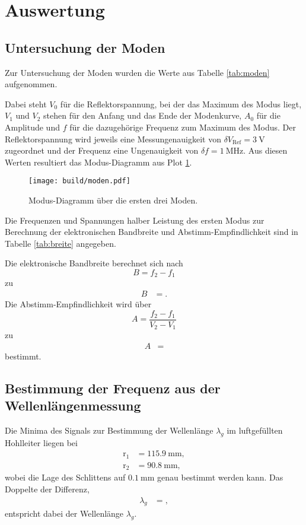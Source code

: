 \section{Auswertung}
\label{sec:Auswertung}


\subsection{Untersuchung der Moden}

Zur Untersuchung der Moden wurden die Werte aus Tabelle \ref{tab:moden} aufgenommen.

Dabei steht $V_0$ für die Reflektorspannung, bei der das Maximum des Modus liegt, $V_1$ und $V_2$ stehen für den Anfang und das Ende der Modenkurve, $A_0$ für die Amplitude und $f$ für die dazugehörige Frequenz zum Maximum des Modus.
Der Reflektorspannung wird jeweils eine Messungenauigkeit von $\delta V_\text{Ref} = \SI{3}{\volt}$ zugeordnet und der Frequenz eine Ungenauigkeit von $\delta f = \SI{1}{\mega\hertz}$.
Aus diesen Werten resultiert das Modus-Diagramm aus Plot \ref{plot:modus}.
\begin{figure}
  \centering
  \texttt{[image: build/moden.pdf]}
  \caption{Modus-Diagramm über die ersten drei Moden.}
  \label{plot:modus}
\end{figure}

Die Frequenzen und Spannungen halber Leistung des ersten Modus zur Berechnung der elektronischen Bandbreite und Abstimm-Empfindlichkeit sind in Tabelle \ref{tab:breite} angegeben.

Die elektronische Bandbreite berechnet sich nach
\begin{equation}
  B = f_2-f_1
\end{equation}
zu
\begin{align*}
  B &= .
\end{align*}
Die Abstimm-Empfindlichkeit wird über
\begin{equation}
  A = \frac{f_2-f_1}{V_2-V_1}
\end{equation}
zu
\begin{align*}
  A &= 
\end{align*}
bestimmt.

\subsection{Bestimmung der Frequenz aus der Wellenlängenmessung}

Die Minima des Signals zur Bestimmung der Wellenlänge $\lambda_g$ im luftgefüllten Hohlleiter liegen bei
\begin{align*}
  \text{r}_1 &= \SI{115.9}{\milli\meter}, \\
  \text{r}_2 &= \SI{90.8}{\milli\meter},
\end{align*}
wobei die Lage des Schlittens auf $\SI{0.1}{\milli\meter}$ genau bestimmt werden kann.
Das Doppelte der Differenz,
\begin{align*}
  \lambda_g &= ,
\end{align*}
entspricht dabei der Wellenlänge $\lambda_g$.

